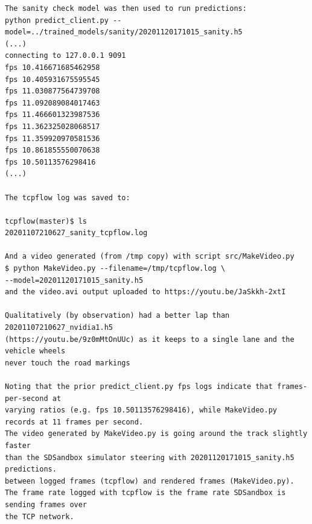 \begin{verbatim}
The sanity check model was then used to run predictions:
python predict_client.py --model=../trained_models/sanity/20201120171015_sanity.h5
(...)
connecting to 127.0.0.1 9091
fps 10.416671685462958
fps 10.405931675595545
fps 11.030877564739708
fps 11.092089084017463
fps 11.466601323987536
fps 11.362325028068517
fps 11.359920970581536
fps 10.861855550070638
fps 10.50113576298416
(...)

The tcpflow log was saved to:

tcpflow(master)$ ls
20201107210627_sanity_tcpflow.log

And a video generated (from /tmp copy) with script src/MakeVideo.py
$ python MakeVideo.py --filename=/tmp/tcpflow.log \ 
--model=20201120171015_sanity.h5 
and the video.avi output uploaded to https://youtu.be/JaSkkh-2xtI

Qualitatively (by observation) had a better lap than 20201107210627_nvidia1.h5 
(https://youtu.be/9z0mMtOnUUc) as it keeps to a single lane and the vehicle wheels
never touch the road markings

Noting that the prior predict_client.py fps logs indicate that frames-per-second at
varying ratios (e.g. fps 10.50113576298416), while MakeVideo.py records at 11 frames per second.
The video generated by MakeVideo.py is going around the track slightly faster
than the SDSandbox simulator steering with 20201120171015_sanity.h5 predictions.
between logged frames (tcpflow) and rendered frames (MakeVideo.py).
The frame rate logged with tcpflow is the frame rate SDSandbox is sending frames over 
the TCP network.



\end{verbatim}

